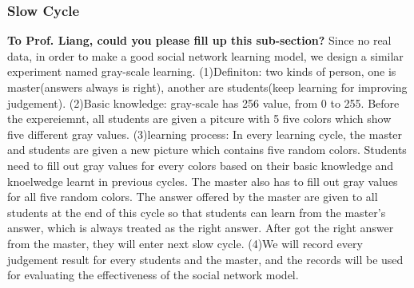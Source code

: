 \subsubsection{Slow Cycle}
{\bf To Prof. Liang, could you please fill up this sub-section?}
Since no real data, in order to make a good social network learning model, we design a similar experiment named gray-scale learning.
(1)Definiton: two kinds of person, one is master(answers always is right), another are students(keep learning for improving judgement).
(2)Basic knowledge: gray-scale has 256 value, from 0 to 255. Before the expereiemnt, all students are given a pitcure with 5 
 five colors which show five different gray values.
(3)learning process: In every learning cycle, the master and students are given a new picture which contains five random colors.  Students need to 
fill out gray values for every colors based on their basic knowledge and knoelwedge learnt in previous cycles. 
The master also has to fill out gray values for all five random colors. The answer offered by the master are given to all students at 
the end of this cycle so that students can learn from the master's answer, which is always treated as the right answer. 
After got the right answer from the master, they will enter next slow cycle. 
(4)We will record every judgement result for every students and the master, and the records will be used for evaluating the effectiveness of 
the social network model. 




